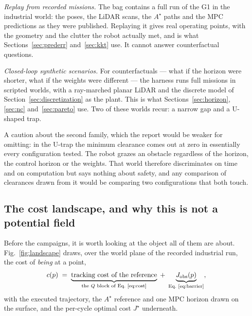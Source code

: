\documentclass[11pt,a4paper]{article}
\newcommand{\astar}{$A^\star$}
\newcommand{\Jobs}{J_{\mathrm{obs}}}
\begin{document}
\emph{Replay from recorded missions.} The bag \resBag{} contains a full run of the G1 in the industrial world:
the poses, the LiDAR scans, the \astar{} paths and the MPC predictions as they were published. Replaying it
gives real operating points, with the geometry and the clutter the robot actually met, and is what
Sections~\ref{sec:prederr} and~\ref{sec:kkt} use. It cannot answer counterfactual questions.

\emph{Closed-loop synthetic scenarios.} For counterfactuals --- what if the horizon were shorter, what if the
weights were different --- the harness runs full missions in scripted worlds, with a ray-marched planar
LiDAR and the discrete model of Section~\ref{sec:discretization} as the plant. This is what
Sections~\ref{sec:horizon}, \ref{sec:nc} and~\ref{sec:pareto} use. Two of these worlds recur: a narrow gap
and a U-shaped trap.

A caution about the second family, which the report would be weaker for omitting: in the U-trap the minimum
clearance comes out at zero in essentially every configuration tested. The robot grazes an obstacle
regardless of the horizon, the control horizon or the weights. That world therefore discriminates on time and
on computation but says nothing about safety, and any comparison of clearances drawn from it would be
comparing two configurations that both touch.

\subsection{The cost landscape, and why this is not a potential field}
\label{sec:landscape}

Before the campaigns, it is worth looking at the object all of them are about. Fig.~\ref{fig:landscape}
draws, over the world plane of the recorded industrial run, the cost of \emph{being} at a point,
\begin{equation}
  c(p) \;=\; \underbrace{\text{tracking cost of the reference}}_{\text{the }Q\text{ block of Eq.~\eqref{eq:cost}}}
        \;+\; \underbrace{\Jobs(p)}_{\text{Eq.~\eqref{eq:barrier}}},
  \label{eq:landscape}
\end{equation}
with the executed trajectory, the \astar{} reference and one MPC horizon drawn on the surface, and the
per-cycle optimal cost $J^\star$ underneath.
\end{document}

